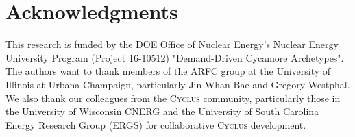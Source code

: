 \documentclass{anstrans}
\newcommand{\Cyclus}{\textsc{Cyclus}\xspace}%
\begin{document}
\section{Acknowledgments}
This research is funded by the \gls{DOE} Office of 
Nuclear Energy's Nuclear Energy University Program (Project 16-10512) 
"Demand-Driven Cycamore Archetypes". The authors want to thank members of the 
\gls{ARFC} group at the University of Illinois at Urbana-Champaign, 
particularly Jin Whan Bae and Gregory Westphal. We also thank our colleagues 
from the \Cyclus community, particularly those in the University of Wisconsin 
\gls{CNERG} and the University of South Carolina Energy Research Group (ERGS) 
for collaborative \Cyclus development.



\end{document}
